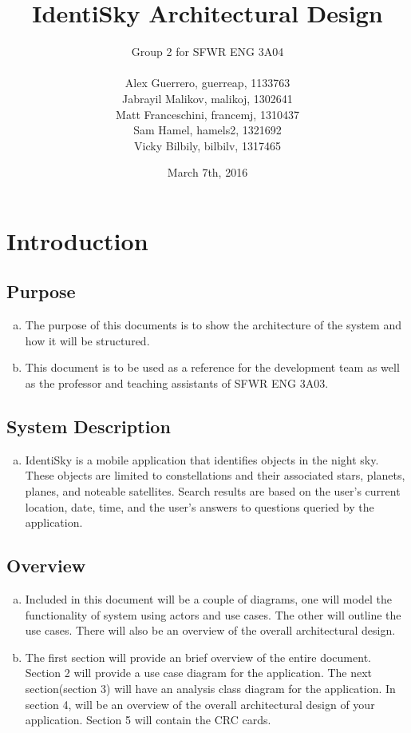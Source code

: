 \documentclass[]{article}
\title{IdentiSky Architectural Design}
\author{Group 2 for SFWR ENG 3A04 \\
\\ 
Alex Guerrero, guerreap, 1133763 \\
Jabrayil Malikov, malikoj, 1302641 \\
Matt Franceschini, francemj, 1310437 \\
Sam Hamel, hamels2, 1321692 \\
Vicky Bilbily, bilbilv, 1317465 \\
}
\date{March 7th, 2016}
\begin{document}
\maketitle	

\section{Introduction}
\label{sec:introduction}


\subsection{Purpose}
\label{sub:purpose}
\begin{enumerate}[a)]
	\item The purpose of this documents is to show the architecture of the system and how it will be structured.
	\item This document is to be used as a reference for the development team as well as the professor and teaching assistants of SFWR ENG 3A03. 

\end{enumerate}

\subsection{System Description}
\label{sub:system_description}
\begin{enumerate}[a)]
	\item IdentiSky is a mobile application that identifies objects in the night sky. These objects are limited to constellations and their associated stars, planets, planes, and noteable satellites. Search results are based on the user's current location, date, time, and the user's answers to questions queried by the application. 

\end{enumerate}

\subsection{Overview}
\label{sub:overview}
\begin{enumerate}[a)]

	\item Included in this document will be a couple of diagrams, one will model the functionality of system using actors
and use cases. The other will outline the use cases. There will also be an overview of the overall architectural design. 

	\item The first section will provide an brief overview of the entire document. Section 2 will provide a use case diagram for the application. The next section(section 3) will have an analysis class diagram for the application. In section 4, will be an overview of the overall architectural design of your application. Section 5 will contain the CRC cards.
	
\end{enumerate}
\end{document}
